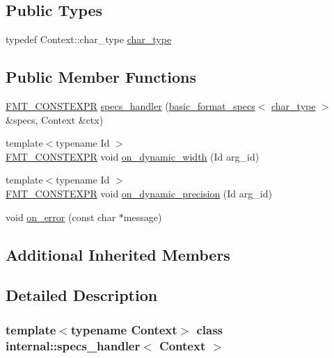 \subsection*{Public Types}
\begin{DoxyCompactItemize}
\item 
typedef Context\+::char\+\_\+type \hyperlink{classinternal_1_1specs__handler_a1ddb6ad8becb4f481847b58db65200bc}{char\+\_\+type}
\end{DoxyCompactItemize}
\subsection*{Public Member Functions}
\begin{DoxyCompactItemize}
\item 
\hyperlink{core_8h_a69201cb276383873487bf68b4ef8b4cd}{F\+M\+T\+\_\+\+C\+O\+N\+S\+T\+E\+X\+PR} \hyperlink{classinternal_1_1specs__handler_a94c87e8b33109b0e3ef1ac1edc24aa74}{specs\+\_\+handler} (\hyperlink{structbasic__format__specs}{basic\+\_\+format\+\_\+specs}$<$ \hyperlink{classinternal_1_1specs__handler_a1ddb6ad8becb4f481847b58db65200bc}{char\+\_\+type} $>$ \&specs, Context \&ctx)
\item 
{\footnotesize template$<$typename Id $>$ }\\\hyperlink{core_8h_a69201cb276383873487bf68b4ef8b4cd}{F\+M\+T\+\_\+\+C\+O\+N\+S\+T\+E\+X\+PR} void \hyperlink{classinternal_1_1specs__handler_ae09c0faa48977d5efbd207ce4e38f8e3}{on\+\_\+dynamic\+\_\+width} (Id arg\+\_\+id)
\item 
{\footnotesize template$<$typename Id $>$ }\\\hyperlink{core_8h_a69201cb276383873487bf68b4ef8b4cd}{F\+M\+T\+\_\+\+C\+O\+N\+S\+T\+E\+X\+PR} void \hyperlink{classinternal_1_1specs__handler_a4dba5b2eee3b59e3c3c09b6774e888fb}{on\+\_\+dynamic\+\_\+precision} (Id arg\+\_\+id)
\item 
void \hyperlink{classinternal_1_1specs__handler_a7d55879a00c71c833714b357c6a0bd78}{on\+\_\+error} (const char $\ast$message)
\end{DoxyCompactItemize}
\subsection*{Additional Inherited Members}


\subsection{Detailed Description}
\subsubsection*{template$<$typename Context$>$\newline
class internal\+::specs\+\_\+handler$<$ Context $>$}



